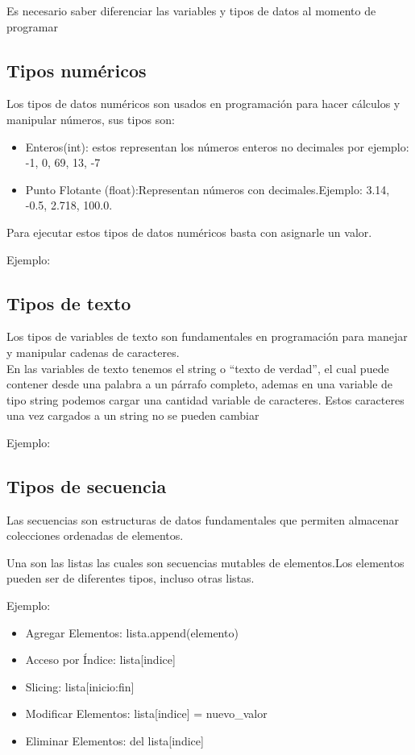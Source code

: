 
Es necesario saber diferenciar las variables y tipos de datos al momento de programar

\subsection{Tipos numéricos}
Los tipos de datos numéricos son usados en programación para hacer cálculos y manipular números, sus tipos son:
\begin{itemize}
\item Enteros(int): estos representan los números enteros no decimales por ejemplo: -1, 0, 69, 13, -7
\item Punto Flotante (float):Representan números con decimales.Ejemplo: 3.14, -0.5, 2.718, 100.0.
\end{itemize}
Para ejecutar estos tipos de datos numéricos basta con asignarle un valor.

Ejemplo:

\subsection{Tipos de texto}
Los tipos de variables de texto son fundamentales en programación para manejar y manipular cadenas de caracteres.\\

En las variables de texto tenemos el string o ``texto de verdad'', el cual puede contener desde una palabra a un párrafo completo, ademas en una variable de tipo string podemos cargar una cantidad variable de caracteres. Estos caracteres una vez cargados a un string no se pueden cambiar

Ejemplo:

\subsection{Tipos de secuencia}
Las secuencias son estructuras de datos fundamentales que permiten almacenar colecciones ordenadas de elementos.

Una son las listas las cuales son secuencias mutables de elementos.Los elementos pueden ser de diferentes tipos, incluso otras listas.

Ejemplo:

\begin{itemize}
    \item Agregar Elementos: lista.append(elemento)
    \item Acceso por Índice: lista[indice]
    \item Slicing: lista[inicio:fin]
    \item Modificar Elementos: lista[indice] = nuevo\_valor
    \item Eliminar Elementos: del lista[indice]
\end{itemize}

